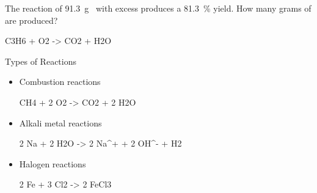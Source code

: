 \documentclass[11pt,letterpaper]{article}
\begin{document}
\begin{onyourown}[20em]
	The reaction of \SI{91.3}{\gram}~ with excess  produces
	a \SI{81.3}{\percent} yield. How many grams of  are produced?
	\begin{reaction*}
		C3H6\gas{} + O2\gas{} -> CO2\gas{} + H2O\lqd{}
	\end{reaction*}
\end{onyourown}

%
%
%
%
%
%
%
%
%
%
%
%
%
%

\begin{frame}{Types of Reactions}
	\begin{itemize}
		\item Combustion reactions
			\begin{reaction*}
				CH4\gas{} + 2 O2\gas{} -> CO2\gas{} + 2
				H2O\gas{}
			\end{reaction*}
			
		\item Alkali metal reactions
			\begin{reaction*}
				2 Na\sld{} + 2 H2O\lqd{} -> 2
				Na^{+}\aq{} + 2 OH^{-}\aq{} + H2\gas{}
			\end{reaction*}

		\item Halogen reactions
			\begin{reaction*}
				2 Fe\sld{} + 3 Cl2\gas{} -> 2
				FeCl3\sld{}
			\end{reaction*}
	\end{itemize}
\end{frame}
\end{document}
